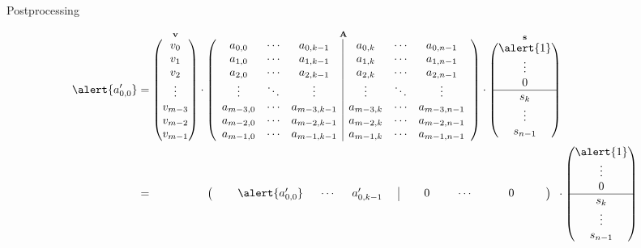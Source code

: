\documentclass[presentation,smaller]{beamer}
\renewcommand{\vec}[1]{\ensuremath{\mathbf{#1}}\xspace}
\begin{document}
\begin{frame}[label={sec:org9045268}]{Postprocessing}
\begin{center}
\scriptsize
\begin{align*}
\alert{a'_{0,0}} &= \overset{\vec{v}}{\begin{pmatrix}
v_0\\
v_1\\
v_2\\
\vdots\\
v_{m-3}\\
v_{m-2}\\
v_{m-1}\\
\end{pmatrix}} \cdot 
\overset{\vec{A}}{
\left(\begin{array}{ccc|ccc} 
a_{0,0} & \cdots & a_{0,k-1} & a_{0,k} & \cdots & a_{0,n-1}\\
a_{1,0} & \cdots & a_{1,k-1} & a_{1,k} & \cdots & a_{1,n-1}\\
a_{2,0} & \cdots & a_{2,k-1} & a_{2,k} & \cdots & a_{2,n-1}\\
\vdots  & \ddots & \vdots & \vdots & \ddots & \vdots\\
a_{m-3,0} & \cdots & a_{m-3,k-1} & a_{m-3,k} & \cdots & a_{m-3,n-1}\\
a_{m-2,0} & \cdots & a_{m-2,k-1} & a_{m-2,k} & \cdots & a_{m-2,n-1}\\
a_{m-1,0} & \cdots & a_{m-1,k-1} & a_{m-1,k} & \cdots & a_{m-1,n-1}\\
\end{array}\right)} \cdot 
\overset{\vec{s}}{\begin{pmatrix}\alert{1}\\ \vdots\\ 0\\ \hline s_k\\ \vdots\\ s_{n-1}\\ \end{pmatrix}}\\
&= \phantom{\begin{pmatrix}v_m-3\end{pmatrix} \cdot\ } \left(\begin{array}{ccc|ccc} 
\phantom{xxx} \alert{a'_{0,0}} \phantom{x} & \cdots & \phantom{x} a'_{0,k-1} \phantom{xi} & \phantom{xxx} 0 \phantom{xxi} & \cdots & \phantom{xxxx} 0 \phantom{xxxx}\\
\end{array}\right) \phantom{i} \cdot {\begin{pmatrix}\alert{1}\\ \vdots\\ 0\\ \hline s_k\\ \vdots\\ s_{n-1}\\ \end{pmatrix}}\\
\end{align*}
\end{center}
\end{frame}
\end{document}
